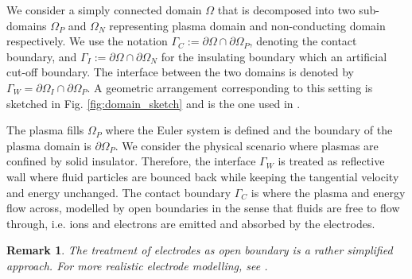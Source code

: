 \documentclass{article}
\newtheorem*{remark}{Remark}
\begin{document}
We consider a simply connected domain $\Omega$ that is decomposed into two sub-domains $\Omega_P$ and $\Omega_N$ representing plasma domain and non-conducting domain respectively. We use the notation $\Gamma_C := \partial\Omega \cap \partial\Omega_P$, denoting the contact boundary, and $\Gamma_I := \partial\Omega \cap \partial\Omega_N$ for the insulating boundary which an artificial cut-off boundary. The interface between the two domains is denoted by $\Gamma_W = \partial\Omega_I \cap \partial\Omega_P$. A geometric arrangement corresponding to this setting is sketched in Fig. \ref{fig:domain_sketch} and is the one used in \cite[][ch. 1, sec. 4]{fuchs_2021}. 

The plasma fills $\Omega_P$ where the Euler system is defined and the boundary of the plasma domain is $\partial\Omega_P$. We consider the physical scenario where plasmas are confined by solid insulator. Therefore, the interface $\Gamma_W$ is treated as reflective wall where fluid particles are bounced back while keeping the tangential velocity and energy unchanged. The contact boundary $\Gamma_C$ is where the plasma and energy flow across, modelled by open boundaries in the sense that fluids are free to flow through, i.e. ions and electrons are emitted and absorbed by the electrodes. 

\begin{remark}
    The treatment of electrodes as open boundary is a rather simplified approach. For more realistic electrode modelling, see \cite{godyak_1990, parker_1993}.
\end{remark}
\end{document}
